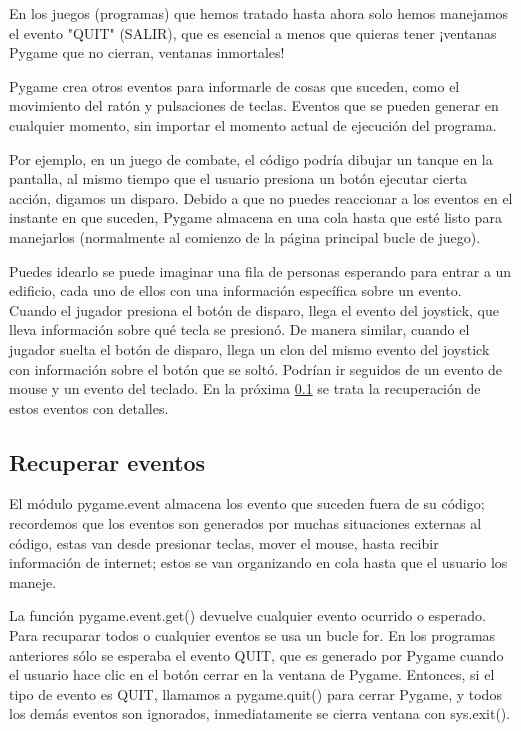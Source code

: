 En los juegos (programas) que hemos tratado hasta ahora solo hemos  manejamos el evento {\ttfamily "{}QUIT"{}} (SALIR), que es 
esencial a menos que quieras tener ¡ventanas Pygame que no cierran, ventanas inmortales!  

Pygame crea otros eventos para informarle de cosas que suceden, como el movimiento del ratón y pulsaciones de teclas.  Eventos que se pueden generar en cualquier momento, sin importar el momento actual de ejecución del programa.

Por ejemplo, en un juego de combate, el código podría dibujar un tanque en la pantalla, al mismo tiempo que el usuario presiona un botón ejecutar cierta acción, digamos un disparo. Debido a que no puedes reaccionar a los eventos en el instante en que suceden, Pygame almacena
en una cola hasta que esté listo para manejarlos (normalmente al comienzo de la página principal bucle de juego). 

Puedes idearlo  se puede imaginar una fila de personas esperando para entrar a un edificio, cada uno de ellos con una información específica sobre un evento. Cuando el jugador presiona el botón de disparo, llega el evento del joystick, que lleva información sobre qué tecla se presionó. De manera similar, cuando el jugador suelta el botón de disparo, llega un clon del mismo evento del joystick con información
sobre el botón que se soltó. Podrían ir seguidos de un evento de mouse y un evento del teclado. En la próxima  \ref{recuparar} se trata  la recuperación de  estos eventos con detalles.



\subsection{Recuperar eventos}\label{recuparar}

El módulo {\ttfamily pygame.event} almacena los evento que suceden fuera de su código; recordemos que los eventos son generados por
muchas situaciones externas al código, estas van desde presionar teclas, mover el mouse,  hasta recibir información de internet; estos  se van organizando en cola hasta que el usuario los maneje. 
 
La función {\ttfamily pygame.event.get()} devuelve cualquier evento ocurrido o esperado. Para recuparar todos o cualquier eventos se usa un bucle {\ttfamily for}.  En los programas anteriores sólo se esperaba el evento {\ttfamily QUIT}, que es generado por Pygame cuando el usuario hace clic en el botón cerrar en la ventana de Pygame. Entonces, si el tipo de evento es {\ttfamily QUIT}, llamamos a
{\ttfamily pygame.quit()} para cerrar  Pygame, y todos los demás eventos son ignorados, inmediatamente se cierra ventana con {\ttfamily sys.exit()}. 

